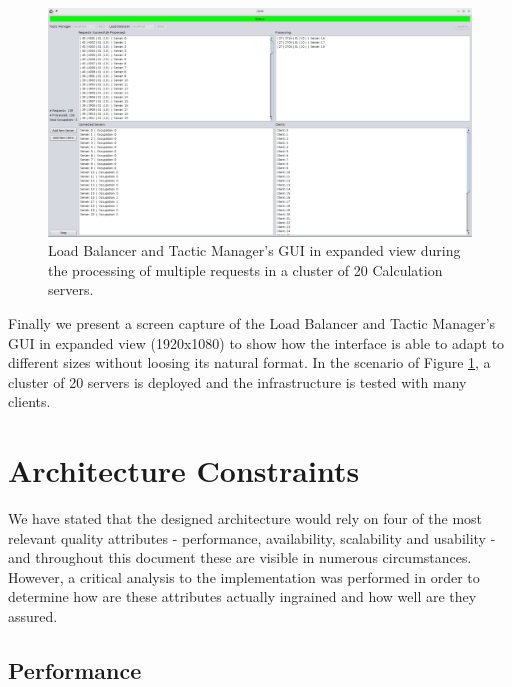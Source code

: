 \documentclass[12pt]{article}
\begin{document}
\begin{figure}[H]
  \centering
  \begin{minipage}{\textwidth}
    \centering
    \includegraphics[width=\linewidth]{img/LBM_large.png}
  \end{minipage}%
  \caption{Load Balancer and Tactic Manager's GUI in expanded view during the processing of multiple requests in a cluster of 20 Calculation servers.}
  \label{fig:LBM_large}
\end{figure} 

Finally we present a screen capture of the Load Balancer and Tactic Manager's GUI in expanded view (1920x1080) to show how the interface is able to adapt to 
different sizes without loosing its natural format.
In the scenario of Figure \ref{fig:LBM_large}, a cluster of 20 servers is deployed and the infrastructure is tested with many clients.

\newpage
\section{Architecture Constraints} \label{constraints} %

We have stated that the designed architecture would rely on four of the most relevant quality attributes - performance, availability, scalability and usability - 
and throughout this document these are visible in numerous circumstances.
However, a critical analysis to the implementation was performed in order to determine how are these attributes actually ingrained and how well are they assured.

\subsection{Performance} \label{performance}
\end{document}
